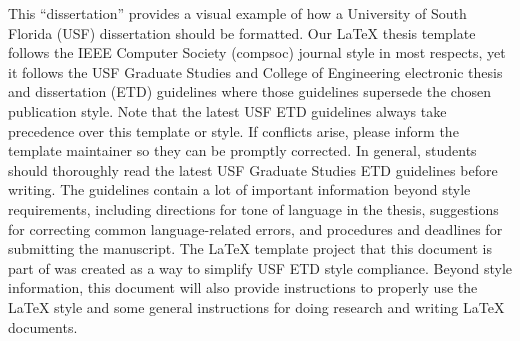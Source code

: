 This ``dissertation'' provides a visual example of how a University of South Florida (USF) dissertation should be formatted. Our LaTeX thesis template follows the IEEE Computer Society (compsoc) journal style in most respects, yet it follows the USF Graduate Studies and College of Engineering electronic thesis and dissertation (ETD) guidelines where those guidelines supersede the chosen publication style. Note that the latest USF ETD guidelines always take precedence over this template or style. If conflicts arise, please inform the template maintainer so they can be promptly corrected. In general, students should thoroughly read the latest USF Graduate Studies ETD guidelines before writing. The guidelines contain a lot of important information beyond style requirements, including directions for tone of language in the thesis, suggestions for correcting common language-related errors, and procedures and deadlines for submitting the manuscript. The LaTeX template project that this document is part of was created as a way to simplify USF ETD style compliance. Beyond style information, this document will also provide instructions to properly use the LaTeX style and some general instructions for doing research and writing LaTeX documents.